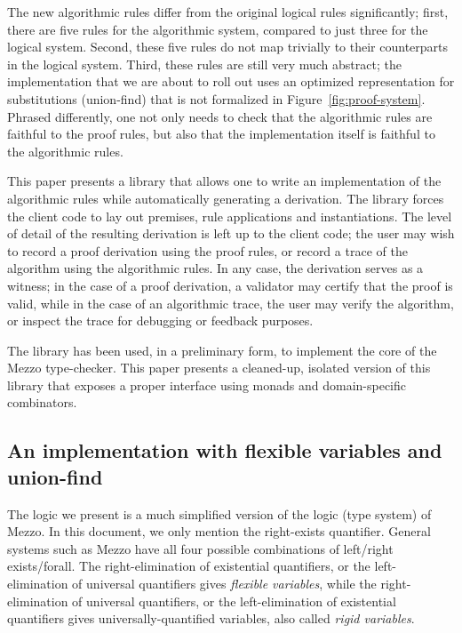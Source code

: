 \documentclass{easychair}
\newcommand{\fref}[1]{Figure~\ref{fig:#1}}
\begin{document}
The new algorithmic rules differ from the original logical rules significantly;
first, there are five rules for the algorithmic system, compared to just three
for the logical system. Second, these five rules do not map trivially to their
counterparts in the logical system. Third, these rules are still very much
abstract; the implementation that we are about to roll out uses an
optimized representation for substitutions (union-find) that is not formalized
in \fref{proof-system}. Phrased differently, one not only needs to check that
the algorithmic rules are faithful to the proof rules, but also that the
implementation itself is faithful to the algorithmic rules.

This paper presents a library that allows one to write an implementation of the
algorithmic rules while automatically generating a derivation. The library
forces the client code to lay out premises, rule applications and
instantiations. The level of detail of the resulting derivation is left up to
the client code; the user may wish to record a proof derivation using the proof
rules, or record a trace of the algorithm using the algorithmic rules.  In any
case, the derivation serves as a witness; in the case of a proof derivation, a
validator may certify that the proof is valid, while in the case of an
algorithmic trace, the user may verify the algorithm, or inspect the trace for
debugging or feedback purposes.

The library has been used, in a preliminary form, to implement the core of the
Mezzo type-checker. This paper presents a cleaned-up, isolated version of this
library that exposes a proper interface using monads and domain-specific
combinators.

\subsection{An implementation with flexible variables and union-find}

The logic we present is a much simplified version of the logic (type system) of
Mezzo. In this document, we only mention the right-exists quantifier. General
systems such as Mezzo have all four possible combinations of left/right
exists/forall.
%
The right-elimination of existential quantifiers, or the left-elimination of
universal quantifiers gives \emph{flexible variables}, while the
right-elimination of universal quantifiers, or the left-elimination of
existential quantifiers gives universally-quantified variables, also called
\emph{rigid variables}.
\end{document}
